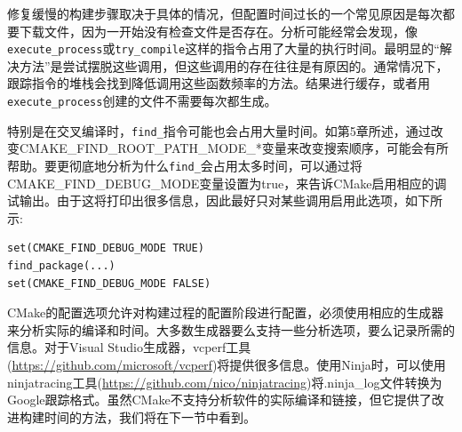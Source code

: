 修复缓慢的构建步骤取决于具体的情况，但配置时间过长的一个常见原因是每次都要下载文件，因为一开始没有检查文件是否存在。分析可能经常会发现，像\texttt{execute\_process}或\texttt{try\_compile}这样的指令占用了大量的执行时间。最明显的“解决方法”是尝试摆脱这些调用，但这些调用的存在往往是有原因的。通常情况下，跟踪指令的堆栈会找到降低调用这些函数频率的方法。结果进行缓存，或者用\texttt{execute\_process}创建的文件不需要每次都生成。

特别是在交叉编译时，\texttt{find\_}指令可能也会占用大量时间。如第5章所述，通过改变CMAKE\_FIND\_ROOT\_PATH\_MODE\_*变量来改变搜索顺序，可能会有所帮助。要更彻底地分析为什么\texttt{find\_}会占用太多时间，可以通过将CMAKE\_FIND\_DEBUG\_MODE变量设置为true，来告诉CMake启用相应的调试输出。由于这将打印出很多信息，因此最好只对某些调用启用此选项，如下所示:

\begin{lstlisting}[style=styleCMake]
set(CMAKE_FIND_DEBUG_MODE TRUE)
find_package(...)
set(CMAKE_FIND_DEBUG_MODE FALSE)
\end{lstlisting}

CMake的配置选项允许对构建过程的配置阶段进行配置，必须使用相应的生成器来分析实际的编译和时间。大多数生成器要么支持一些分析选项，要么记录所需的信息。对于Visual Studio生成器，vcperf工具(\url{https://github.com/microsoft/vcperf})将提供很多信息。使用Ninja时，可以使用ninjatracing工具(\url{https://github.com/nico/ninjatracing})将.ninja\_log文件转换为Google跟踪格式。虽然CMake不支持分析软件的实际编译和链接，但它提供了改进构建时间的方法，我们将在下一节中看到。































